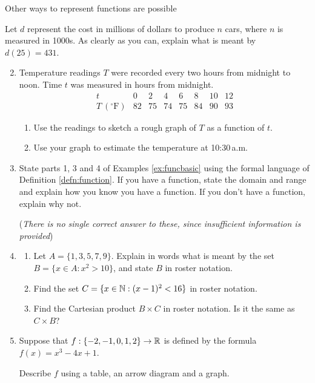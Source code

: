 Other ways to represent functions are possible


\clearpage


\begin{exercises}{}{}
\exstart Let $d$ represent the cost in millions of dollars to produce $n$ cars, where $n$ is measured in 1000s. As clearly as you can, explain what is meant by $d(25)=431$. 

\begin{enumerate}\setcounter{enumi}{1}
	\item Temperature readings $T$ were recorded every two hours from midnight to noon. Time $t$ was measured in hours from midnight.
  \[\begin{array}{l|ccccccc}
  t&0&2&4&6&8&10&12\\\hline
  T\ (^\circ\mathrm{F})&82&75&74&75&84&90&93
  \end{array}\]
  \begin{enumerate}
    \item Use the readings to sketch a rough graph of $T$ as a function of $t$.
    \item Use your graph to estimate the temperature at 10:30\,a.m.
  \end{enumerate}
  
  
  \item State parts 1, 3 and 4 of Examples \ref{ex:funcbasic} using the formal language of Definition \ref{defn:function}. If you have a function, state the domain and range and explain how you know you have a function. If you don't have a function, explain why not.\par
  (\emph{There is no single correct answer to these, since insufficient information is provided})
  
  \item\begin{enumerate}
    \item Let $A=\{1,3,5,7,9\}$. Explain in words what is meant by the set $B=\{x\in A:x^2>10\}$, and state $B$ in roster notation.
    \item Find the set $C=\{x\in\mathbb{N}:(x-1)^2<16\}$ in roster notation.
    \item Find the Cartesian product $B\times C$ in roster notation. Is it the same as $C\times B$?
  \end{enumerate}
  
  \item Suppose that $f:\{-2,-1,0,1,2\}\to\mathbb{R}$ is defined by the formula $f(x)=x^3-4x+1$.\par
  Describe $f$ using a table, an arrow diagram and a graph.
  

\end{enumerate}
\end{exercises}

